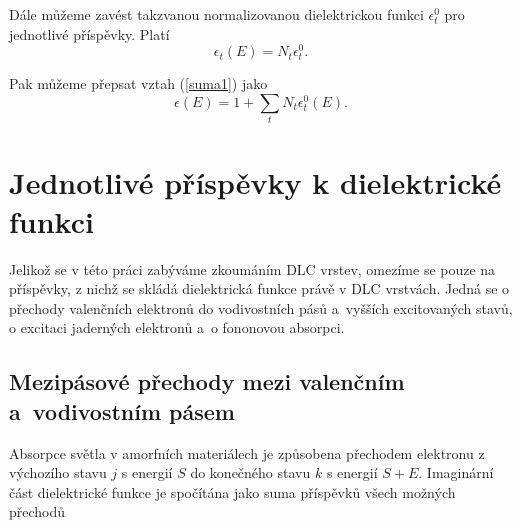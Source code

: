 Dále můžeme zavést takzvanou normalizovanou dielektrickou funkci $\epsilon_t^0$ pro jednotlivé příspěvky. Platí 
\begin{equation}
\epsilon_t(E) = N_t \epsilon_t^0  \text{.}
\end{equation}

Pak můžeme přepsat vztah (\ref{suma1}) jako
\begin{equation}
\epsilon (E) = 1 + \sum_t N_t \epsilon_t^0(E) \text{.}
\end{equation}




\section{Jednotlivé příspěvky k dielektrické funkci}
Jelikož se v této práci zabýváme zkoumáním DLC vrstev, omezíme se pouze na příspěvky, z nichž se skládá dielektrická funkce právě v DLC vrstvách. Jedná se o přechody valenčních elektronů do vodivostních pásů a~vyšších excitovaných stavů, o excitaci jaderných elektronů a~o fononovou absorpci. 

\subsection{Mezipásové přechody mezi valenčním a~vodivostním pásem}
Absorpce světla v amorfních materiálech je způsobena přechodem elektronu z výchozího stavu $j$ s energií $S$ do konečného stavu $k$ s energií $S + E$. Imaginární část dielektrické funkce je spočítána jako suma příspěvků všech možných přechodů

